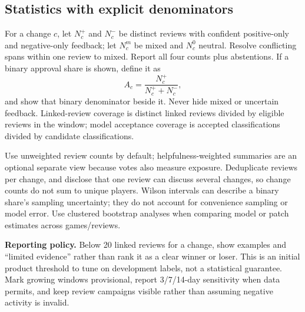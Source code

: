 \documentclass[10pt,letterpaper]{article}
\newcommand{\key}[1]{\textbf{\color{ink}#1}}
\begin{document}
\subsection{Statistics with explicit denominators}
For a change $c$, let $N_c^+$ and $N_c^-$ be distinct reviews with confident positive-only and negative-only feedback; let $N_c^m$ be mixed and $N_c^0$ neutral. Resolve conflicting spans within one review to mixed. Report all four counts plus abstentions. If a binary approval share is shown, define it as
\[
 A_c = \frac{N_c^+}{N_c^+ + N_c^-},
\]
and show that binary denominator beside it. Never hide mixed or uncertain feedback. Linked-review coverage is distinct linked reviews divided by eligible reviews in the window; model acceptance coverage is accepted classifications divided by candidate classifications.

Use unweighted review counts by default; helpfulness-weighted summaries are an optional separate view because votes also measure exposure. Deduplicate reviews per change, and disclose that one review can discuss several changes, so change counts do not sum to unique players. Wilson intervals can describe a binary share's sampling uncertainty; they do not account for convenience sampling or model error. Use clustered bootstrap analyses when comparing model or patch estimates across games/reviews.

\key{Reporting policy.} Below 20 linked reviews for a change, show examples and ``limited evidence'' rather than rank it as a clear winner or loser. This is an initial product threshold to tune on development labels, not a statistical guarantee. Mark growing windows provisional, report 3/7/14-day sensitivity when data permits, and keep review campaigns visible rather than assuming negative activity is invalid.
\end{document}
